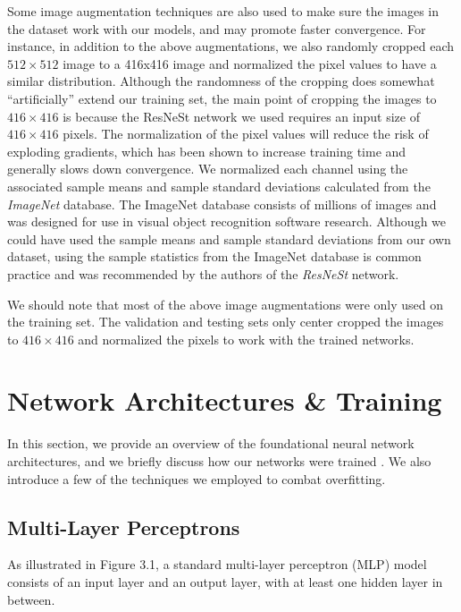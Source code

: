 \documentclass [MAS] {uclathes}
\begin{document}
Some image augmentation techniques are also used to make sure the images in the dataset work with our models, and may promote faster convergence. For instance, in addition to the above augmentations, we also randomly cropped each $512 \times 512$ image to a 416x416 image and normalized the pixel values to have a similar distribution. Although the randomness of the cropping does somewhat ``artificially'' extend our training set, the main point of cropping the images to $416 \times 416$ is because the ResNeSt network we used requires an input size of $416 \times 416$ pixels. The normalization of the pixel values will reduce the risk of exploding gradients, which has been shown to increase training time and generally slows down convergence. We normalized each channel using the associated sample means and sample standard deviations calculated from the \textit{ImageNet} database. The ImageNet database consists of millions of images and was designed for use in visual object recognition software research. Although we could have used the sample means and sample standard deviations from our own dataset, using the sample statistics from the ImageNet database is common practice and was recommended by the authors of the \textit{ResNeSt} network.

We should note that most of the above image augmentations were only used on the training set. The validation and testing sets only center cropped the images to $416 \times 416$ and normalized the pixels to work with the trained networks.

\section{Network Architectures \& Training}

In this section, we provide an overview of the foundational neural network architectures, and we briefly discuss how our networks were trained \cite{MLnote}. We also introduce a few of the techniques we employed to combat overfitting.

\subsection{Multi-Layer Perceptrons}

As illustrated in Figure 3.1, a standard multi-layer perceptron (MLP) model consists of an input layer and an output layer, with at least one hidden layer in between. 
\end{document}
